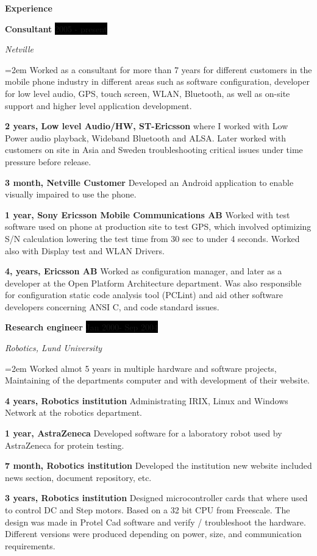\documentclass[a4paper,12pt,final]{memoir}
\newcommand{\SmallSep}{\vspace*{0.5em}}
\newcommand{\CVSection}[1]
	{\Large\textbf{#1}\par
	\SmallSep\normalsize\normalfont}
\newcommand{\CVItem}[1]
	{\textbf{\color{RoyalBlue} #1}}
\newcommand{\sepspace}{\vspace*{1em}}
\newcommand{\EducationEntry}[4]{
  \noindent \textbf{#1} \hfill 					%
  \colorbox{Black} {%
    \parbox{6em}{%
      \hfill\color{White}#2
    }
  } \par		%
  \noindent \textit{#3} \par					%
  \noindent\hangindent=2em\hangafter=0 \small #4 	%
  \normalsize \par
}
\newcommand{\WorkEntry}[4]{
  \noindent \textbf{#1} \hfill              %
  \colorbox{Black}{\color{White}#2} \par    %
  \noindent \textit{#3} \par                %
  \noindent\hangindent=2em\hangafter=0 \small #4 %
  \normalsize \par
}
\begin{document}
\CVSection{Experience}
\WorkEntry{Consultant}{2005 - present}{Netville}{Worked as a consultant for more than 
  7 years for different customers in the mobile phone industry in different areas such 
  as software configuration, developer for low level audio, GPS, touch screen, WLAN, 
  Bluetooth, as well as on-site support and higher level application development.}
\sepspace

\CVItem{2 years, Low level Audio/HW, ST-Ericsson}
  {where I worked with Low Power audio playback, Wideband Bluetooth and ALSA. Later worked with customers 
    on site in Asia and Sweden troubleshooting critical issues under time pressure before release.
  }
\sepspace

\CVItem{3 month, Netville Customer}
{Developed an Android application to enable visually impaired to use the phone.} 
\sepspace

\CVItem{1 year, Sony Ericsson Mobile Communications AB}
  {Worked with test software used on phone at production site to test GPS, which involved optimizing
    S/N calculation lowering the test time from 30 sec to under 4 seconds. Worked also with Display
    test and WLAN Drivers.
  }
\sepspace

\CVItem{4, years, Ericsson AB}	
  {Worked as configuration manager, and later as a developer at the Open Platform Architecture department. 
    Was also responsible for configuration static code analysis tool (PCLint) and aid other software developers
    concerning ANSI C, and code standard issues.}
\clearpage
\framebreak
\framebreak


\WorkEntry{Research engineer}{Jan 2000- Sep 2004}{Robotics, Lund University}{Worked 
  almot 5 years in multiple hardware and software projects, 
  Maintaining of the departments computer and with development of their website.}
\sepspace

\CVItem{4 years, Robotics institution}		
  {Administrating IRIX, Linux and Windows Network at the robotics department.}
\sepspace

\CVItem{1 year, AstraZeneca}		
  {Developed software for a laboratory robot used by AstraZeneca for protein testing. 
  }
\sepspace

\CVItem{7 month, Robotics institution}		
  {Developed the institution new website included news section, document repository, etc. 
  } 
\sepspace

\CVItem{3 years, Robotics institution}		
{Designed microcontroller cards that where used to control DC and Step motors. Based on a 32 bit CPU from 
  Freescale. The design was made in Protel Cad software and verify / troubleshoot the hardware. Different versions were produced depending on power, size, and communication requirements.
}
\sepspace
\end{document}
